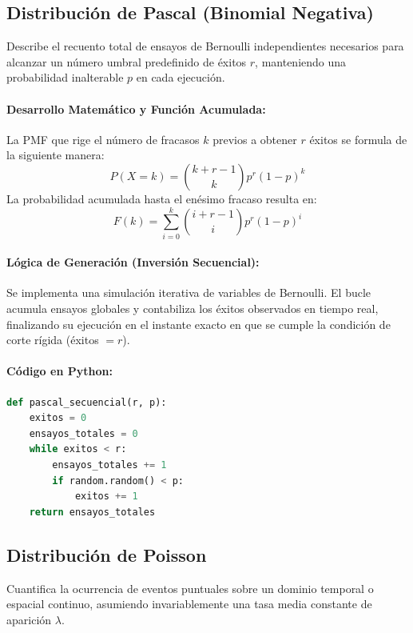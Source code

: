 \documentclass{article}
\begin{document}
\subsection{Distribución de Pascal (Binomial Negativa)}
Describe el recuento total de ensayos de Bernoulli independientes necesarios para alcanzar un número umbral predefinido de éxitos $r$, manteniendo una probabilidad inalterable $p$ en cada ejecución.

\paragraph{Desarrollo Matemático y Función Acumulada:}
La PMF que rige el número de fracasos $k$ previos a obtener $r$ éxitos se formula de la siguiente manera:
\begin{equation}
P(X = k) = \binom{k + r - 1}{k} p^r (1-p)^k
\end{equation}
La probabilidad acumulada hasta el enésimo fracaso resulta en:
\begin{equation}
F(k) = \sum_{i=0}^{k} \binom{i + r - 1}{i} p^r (1-p)^i
\end{equation}

\paragraph{Lógica de Generación (Inversión Secuencial):}
Se implementa una simulación iterativa de variables de Bernoulli. El bucle acumula ensayos globales y contabiliza los éxitos observados en tiempo real, finalizando su ejecución en el instante exacto en que se cumple la condición de corte rígida (éxitos $= r$).

\paragraph{Código en Python:}
\begin{lstlisting}[language=Python, caption=Generador de Pascal por conteo iterativo.]
def pascal_secuencial(r, p):
    exitos = 0
    ensayos_totales = 0
    while exitos < r:
        ensayos_totales += 1
        if random.random() < p:
            exitos += 1
    return ensayos_totales
\end{lstlisting}

\subsection{Distribución de Poisson}
Cuantifica la ocurrencia de eventos puntuales sobre un dominio temporal o espacial continuo, asumiendo invariablemente una tasa media constante de aparición $\lambda$.
\end{document}
